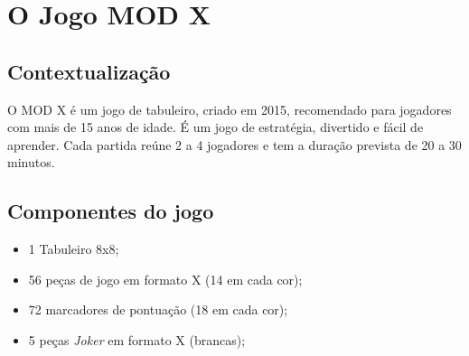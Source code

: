 \documentclass[a4paper]{article}
\begin{document}
%
%
%
%
%
%
%


\section{O Jogo MOD X\newline}

\subsection{Contextualização}
O MOD X é um jogo de tabuleiro, criado em 2015, recomendado para jogadores com mais de 15 anos de idade.
É um jogo de estratégia, divertido e fácil de aprender.
Cada partida reúne 2 a 4 jogadores e tem a duração prevista de 20 a 30 minutos. 

\subsection{Componentes do jogo}
\begin{itemize}
	\item 1 Tabuleiro 8x8;
	\item 56 peças de jogo em formato X (14 em cada cor);
	\item 72 marcadores de pontuação (18 em cada cor);
	\item 5 peças \textit{Joker} em formato X (brancas);
\end{itemize}
\end{document}

